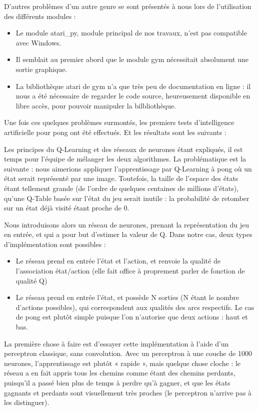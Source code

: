 \documentclass[
    10pt,
    a4paper,
    oneside,
    headinclude,footinclude,
    BCOR=5mm,
    captions=tableabove
]{scrartcl}
\begin{document}
D'autres problèmes d'un autre genre se sont présentés à nous lors de l'utilisation des différents modules :
\begin{itemize}
	\item Le module atari\_py, module principal de nos travaux, n'est pas compatible avec Windows.
	\item Il semblait au premier abord que le module gym nécessitait absolument une sortie graphique.
	\item La bibliothèque atari de gym n'a que très peu de documentation en ligne : il nous a été nécessaire de regarder le code source, heureusement disponible en libre accès, pour pouvoir manipuler la bilbliothèque.
\end{itemize}

	
Une fois ces quelques problèmes surmontés, les premiers tests d'intelligence artificielle pour pong ont été effectués. Et les résultats sont les suivants :

Les principes du Q-Learning et des réseaux de neurones étant expliqués, il est temps pour l’équipe de mélanger les deux algorithmes. La problématique est la suivante : nous aimerions appliquer l’apprentissage par Q-Learning à pong où un état serait représenté par une image. Toutefois, la taille de l’espace des états étant tellement grande (de l’ordre de quelques centaines de millions d’états), qu’une Q-Table basée sur l’état du jeu serait inutile : la probabilité de retomber sur un état déjà visité étant proche de 0.

Nous introduisons alors un réseau de neurones, prenant la représentation du jeu en entrée, et qui a pour but d’estimer la valeur de Q. Dans notre cas, deux types d’implémentation sont possibles :
\begin{itemize}
\item Le réseau prend en entrée l’état et l’action, et renvoie la qualité de l’association état/action (elle fait office à proprement parler de fonction de qualité Q)
\item Le réseau prend en entrée l’état, et possède N sorties (N étant le nombre d’actions possibles), qui correspondent aux qualités des arcs respectifs. Le cas de pong est plutôt simple puisque l’on n’autorise que deux actions : haut et bas.
\end{itemize}

La première chose à faire est d’essayer cette implémentation à l’aide d’un perceptron classique, sans convolution. Avec un perceptron à une couche de 1000 neurones, l’apprentissage est plutôt « rapide », mais quelque chose cloche : le réseau a en fait appris tous les chemins comme étant des chemins perdants, puisqu’il a passé bien plus de temps à perdre qu’à gagner, et que les états gagnants et perdants sont visuellement très proches (le perceptron n’arrive pas à les distinguer).
\end{document}

